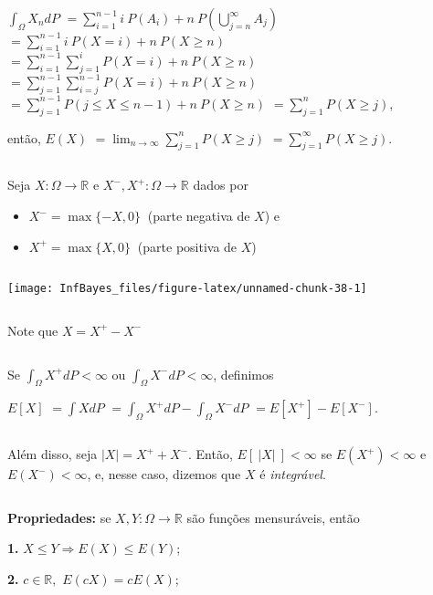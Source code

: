 \documentclass[
]{book}
\begin{document}
\(\displaystyle\int_\Omega X_n dP\) \(=\displaystyle\sum_{i=1}^{n-1} i~P(A_i) + n~P\left(\bigcup_{j=n}^{\infty} A_j\right)\) \(=\displaystyle\sum_{i=1}^{n-1}i~P(X = i) + n~P(X \geq n)\) \(=\displaystyle\sum_{i=1}^{n-1} \sum_{j=1}^{i} P(X = i) + n~P(X \geq n)\) \(\displaystyle=\sum_{j=1}^{n-1} \sum_{i=j}^{n-1} P(X = i) + n~P(X \geq n)\) \(=\displaystyle\sum_{j=1}^{n-1}P(j \leq X \leq n-1) + n~P(X \geq n)\) \(=\displaystyle\sum_{j=1}^n P(X \geq j)\),

então, \(E(X)\) \(\displaystyle=\lim_{n\rightarrow \infty}\sum_{j=1}^nP(X \geq j)\) \(\displaystyle=\sum_{j=1}^{\infty}P(X \geq j)\).

\(~\)

Seja \(X: \Omega \longrightarrow \mathbb{R}\) e \(X^-,X^+: \Omega \longrightarrow \mathbb{R}\) dados por

\begin{itemize}
\item
  \(X^- = \max\{-X,0\}~\) (parte negativa de \(X\)) e
\item
  \(X^+ = \max\{X,0\}~\) (parte positiva de \(X\))
\end{itemize}

\(~\)

\begin{center}\texttt{[image: InfBayes\_files/figure-latex/unnamed-chunk-38-1]} \end{center}

\(~\)

Note que \(X = X^+ - X^-\)

\(~\)

Se \(\displaystyle\int_\Omega X^+ dP < \infty\) ou \(\displaystyle\int_\Omega X^- dP < \infty\), definimos

\(E[X]\) \(=\displaystyle\int X dP\) \(=\displaystyle\int_\Omega X^+dP - \int_\Omega X^- dP\) \(=E\left[X^+\right] - E\left[X^-\right]\).

\(~\)

Além disso, seja \(|X| = X^+ + X^-\). Então, \(E\left[~|X|~\right] < \infty\) se \(E(X^+) < \infty\) e \(E(X^-) < \infty\), e, nesse caso, dizemos que \(X\) é \emph{integrável}.

\(~\)

\textbf{Propriedades:} se \(X, Y: \Omega \longrightarrow \mathbb{R}\) são funções mensuráveis, então

\textbf{1.} \(X \leq Y \Rightarrow E(X) \leq E(Y)\);

\textbf{2.} \(c \in \mathbb{R},\) \(E(cX) = cE(X)\);
\end{document}
